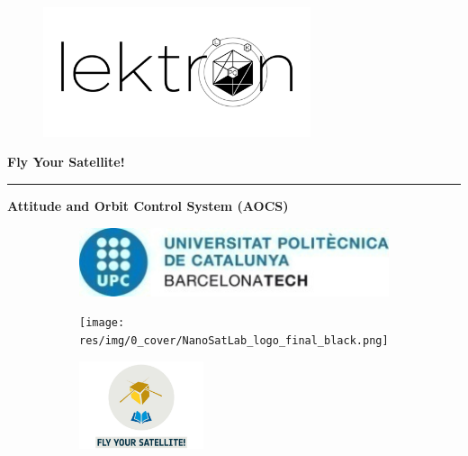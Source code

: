 \clearpage
{}
\thispagestyle{empty}
\begin{center}
{\sffamily 

\begin{figure}[ht]
    \centering
    \includegraphics[width=0.7\textwidth]{res/img/0_cover/lektron&patch.png}
    \label{fig:pocatLektron_patch}
\end{figure}

\vspace{1cm}
{\Huge \textbf{Fly Your Satellite!}}
\vspace{0.5cm}
{\color{black}\hrule height 1pt}
\vspace{0.5cm}
{\qquad \qquad \qquad {}}
\vspace{0.5cm}
\newline
{\LARGE \textbf{Attitude and Orbit Control System (AOCS)}}
\vskip -3cm

\begin{figure}
    \centering
    \begin{subfigure}{0.4\textwidth}
        \centering
        \includegraphics[width=\textwidth]{res/img/0_cover/upclogo.png}
    \end{subfigure} \hfill
    \begin{subfigure}{0.4\textwidth}
        \centering
        \texttt{[image: res/img/0\_cover/NanoSatLab\_logo\_final\_black.png]}
    \end{subfigure}
    \vskip 1cm
    \begin{subfigure}{\textwidth}
        \centering
        \includegraphics[width=0.4\textwidth]{res/img/0_cover/FYS_logo.jpg}
    \end{subfigure}
\end{figure}
}

\end{center}